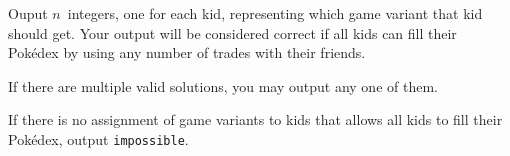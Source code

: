 

Ouput $n$~integers, one for each kid, representing which game variant that kid should get.
Your output will be considered correct if all kids can fill their Pokédex by using any number of trades with their friends.

If there are multiple valid solutions, you may output any one of them.

If there is no assignment of game variants to kids that allows all kids to fill their Pokédex,
output \texttt{impossible}.
